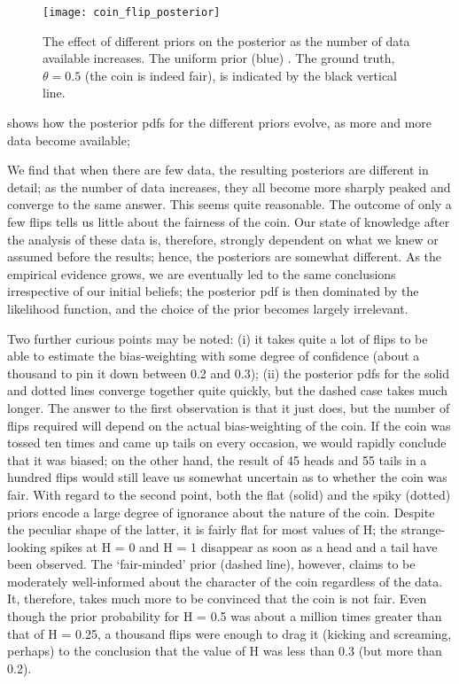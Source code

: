 \begin{figure}[ht]
    \centering
    \texttt{[image: coin\_flip\_posterior]}
    \caption{The effect of different priors on the posterior as the number of data available increases. The uniform prior (blue) . The ground truth, $\theta=0.5$ (the coin is indeed fair), is indicated by the black vertical line. 
    }
    \label{fig:coin_flip_posterior}
\end{figure} 

shows how the posterior pdfs for the different priors evolve, as more and more data become available;


We find that when there are few data, the resulting posteriors are different in detail; as the number of data increases, they all become more sharply peaked and converge to the same answer. This seems quite reasonable. The outcome of only a few flips tells us little about the fairness of the coin. Our state of knowledge after the analysis of these data is, therefore, strongly dependent on what we knew or assumed before the results; hence, the posteriors are somewhat different. As the empirical evidence grows, we are eventually led to the same conclusions irrespective of our initial beliefs; the posterior pdf is then dominated by the likelihood function, and the choice of the prior becomes largely irrelevant.

Two further curious points may be noted: (i) it takes quite a lot of flips to be able to estimate the bias-weighting with some degree of confidence (about a thousand to pin it down between 0.2 and 0.3); (ii) the posterior pdfs for the solid and dotted lines converge together quite quickly, but the dashed case takes much longer. The answer to the first observation is that it just does, but the number of flips required will depend on the actual bias-weighting of the coin. If the coin was tossed ten times and came up tails on every occasion, we would rapidly conclude that it was biased; on the other hand, the result of 45 heads and 55 tails in a hundred flips would still leave us somewhat uncertain as to whether the coin was fair. With regard to the second point, both the flat (solid) and the spiky (dotted) priors encode a large degree of ignorance about the nature of the coin. Despite the peculiar shape of the latter, it is fairly flat for most values of H; the strange-looking spikes at H = 0 and H = 1 disappear as soon as a head and a tail have been observed. The ‘fair-minded’ prior (dashed line), however, claims to be moderately well-informed about the character of the coin regardless of the data. It, therefore, takes much more to be convinced that the coin is not fair. Even though the prior probability for H = 0.5 was about a million times greater than that of H = 0.25, a thousand flips were enough to drag it (kicking and screaming, perhaps) to the conclusion that the value of H was less than 0.3 (but more than 0.2).


